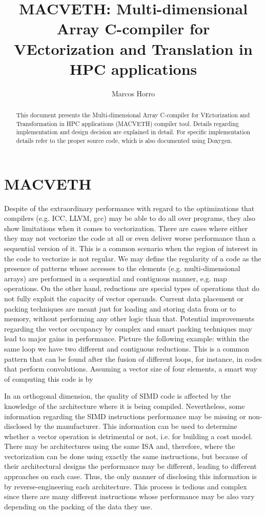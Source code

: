 \documentclass[a4paper,12pt]{memoir}
\title{\textbf{MACVETH}: \textbf{M}ulti-dimensional \textbf{A}rray
    \textbf{C}-compiler for \textbf{VE}ctorization and
    \textbf{T}ranslation in \textbf{H}PC applications}
\author{Marcos Horro}
\date{}
\begin{document}
\maketitle

\begin{abstract}
This document presents the Multi-dimensional Array C-compiler for VEctorization 
and Transformation in HPC applications (MACVETH) compiler tool. Details 
regarding implementation and design decision are explained in detail. For 
specific implementation details refer to the proper source code, which is also 
documented using Doxygen.
\end{abstract}

\chapter{MACVETH}

Despite of the extraordinary performance with regard to the optimizations that compilers (e.g. ICC, LLVM, gcc) may be able to do all over programs, they also show limitations when it comes to vectorization. There are cases where either they may not vectorize the code at all or even deliver worse performance than a sequential version of it. This is a common scenario when the region of interest in the code to vectorize is not regular. We may define the regularity of a code as the presence of patterns whose accesses to the elements (e.g. multi-dimensional arrays) are performed in a sequential and contiguous manner, e.g. map operations. On the other hand, reductions are special types of operations that do not fully exploit the capacity of vector operands. Current data placement or packing techniques are meant just for loading and storing data from or to memory, without performing any other logic than that. Potential improvements regarding the vector occupancy by complex and smart packing techniques may lead to major gains in performance. Picture the following example: within the same loop we have two different and contiguous reductions. This is a common pattern that can be found after the fusion of different loops, for instance, in codes that perform convolutions. Assuming a vector size of four elements, a smart way of computing this code is by 

In an orthogonal dimension, the quality of SIMD code is affected by the knowledge of the architecture where it is being compiled. Nevertheless, some information regarding the SIMD instructions performance may be missing or non-disclosed by the manufacturer. This information can be used to determine whether a vector operation is detrimental or not, i.e. for building a cost model. There may be architectures using the same ISA and, therefore, where the vectorization can be done using exactly the same instructions, but because of their architectural designs the performance may be different, leading to different approaches on each case. Thus, the only manner of disclosing this information is by reverse-engineering each architecture. This process is tedious and complex since there are many different instructions whose performance may be also vary depending on the packing of the data they use.
\end{document}
